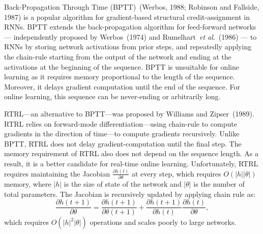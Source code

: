 \documentclass[twoside,11pt]{article}
\newcommand{\etal}{\textit{et al}.}
\begin{document}
Back-Propagation Through Time (BPTT)~(Werbos, 1988; Robinson and Fallside, 1987) is a popular algorithm for gradient-based structural credit-assignment in RNNs. BPTT extends the back-propagation algorithm for feed-forward networks --- independently proposed by Werbos~(1974) and Rumelhart~\etal~(1986) --- to RNNs by storing network activations from prior steps, and repeatedly applying the chain-rule starting from the output of the network and ending at the activations at the beginning of the sequence. BPTT is unsuitable for online learning as it requires memory proportional to the length of the sequence. Moreover, it delays gradient computation until the end of the sequence. For online learning, this sequence can be never-ending or arbitrarily long. 







RTRL---an alternative to BPTT---was proposed by Williams and Zipser~(1989). RTRL relies on forward-mode differentiation---using chain-rule to compute gradients in the direction of time---to compute gradients recursively. Unlike BPTT, RTRL does not delay gradient-computation until the final step. The memory requirement of RTRL also does not depend on the sequence length. As a result, it is a better candidate for real-time online learning. Unfortunately, RTRL requires maintaining the Jacobian $\frac{\partial h(t)}{\partial \theta}$ at every step, which requires $O(|h||\theta|)$ memory, where $|h|$ is the size of state of the network and $|\theta|$ is the number of total parameters. The Jacobian is recursively updated by applying chain rule as:  
$$\frac{\partial h(t+1)}{\partial \theta} =\frac{\partial h(t+1)}{\partial \theta(t+1)} +  \frac{\partial h(t+1)}{\partial h(t)}\frac{\partial h(t)}{\partial \theta}, $$ 
which requires  $O(|h|^2|\theta|)$ operations and scales poorly to large networks.

\end{document}
